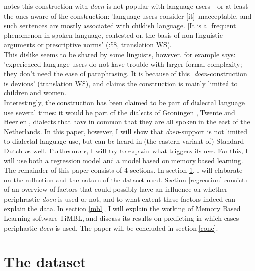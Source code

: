 \documentclass[12pt]{article}
\begin{document}
\citet{g83} notes this construction with \emph{doen} is not popular with language users - or at least the ones aware of the construction: 'language users consider [it] unacceptable, and such sentences are mostly associated with childish language. [It is a] frequent phenomenon in spoken language, contested on the basis of non-linguistic arguments or prescriptive norms' (\citealp{g83}:58, translation WS).\\\indent
This dislike seems to be shared by some linguists, however. \citet[p. 121]{d94} for example says: 'experienced language users do not have trouble with larger formal complexity; they don't need the ease of paraphrasing. It is because of this [\emph{doen}-construction] is devious' (translation WS), and \citet[p. 153]{n62} claims the construction is mainly limited to children and women.\\\indent
Interestingly, the construction has been claimed to be part of dialectal language use several times: it would be part of the dialects of Groningen \citep{tl53}, Twente \citep{n62} and Heerlen \citep{c94}, dialects that have in common that they are all spoken in the east of the Netherlands. In this paper, however, I will show that \emph{doen}-support is not limited to dialectal language use, but can be heard in (the eastern variant of) Standard Dutch as well. Furthermore, I will try to explain what triggers its use. For this, I will use both a regression model and a model based on memory based learning.\\\indent
The remainder of this paper consists of 4 sections. In section \ref{data}, I will elaborate on the collection and the nature of the dataset used. Section \ref{regression} consists of an overview of factors that could possibly have an influence on whether periphrastic \emph{doen} is used or not, and to what extent these factors indeed can explain the data. In section \ref{mbl}, I will explain the working of Memory Based Learning software TiMBL, and discuss its results on predicting in which cases periphastic \emph{doen} is used. The paper will be concluded in section \ref{conc}.






\section{The dataset} \label{data}
\end{document}
